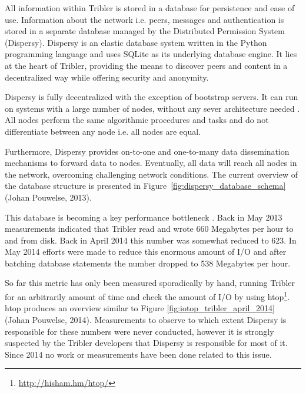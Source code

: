 All information within Tribler is stored in a database for persistence and ease of use.
Information about the network i.e. peers, messages and authentication is stored in a separate database managed by the Distributed Permission System (Dispersy).
Dispersy is an elastic database system written in the Python programming language and uses SQLite as its underlying database engine.
It lies at the heart of Tribler, providing the means to discover peers and content in a decentralized way while offering security and anonymity.

Dispersy is fully decentralized with the exception of bootstrap servers.
It can run on systems with a large number of nodes, without any sever architecture needed \cite{dispersy2016dispersy, zeilemaker2013dispersy}.
All nodes perform the same algorithmic procedures and tasks and do not differentiate between any node i.e. all nodes are equal.

Furthermore, Dispersy provides on-to-one and one-to-many data dissemination mechanisms to forward data to nodes.
Eventually, all data will reach all nodes in the network, overcoming challenging network conditions.
The current overview of the database structure is presented in Figure~\ref{fig:dispersy_database_schema} (Johan Pouwelse, 2013).

This database is becoming a key performance bottleneck \cite{pouwelse2014reduce}.
Back in May 2013 measurements indicated that Tribler read and wrote 660 Megabytes per hour to and from disk.
Back in April 2014 this number was somewhat reduced to 623.
In May 2014 efforts were made to reduce this enormous amount of I/O and after batching database statements the number dropped to 538 Megabytes per hour.

So far this metric has only been measured sporadically by hand, running Tribler for an arbitrarily amount of time and check the amount of I/O by using htop\footnote{\url{http://hisham.hm/htop/}}.
htop produces an overview similar to Figure \ref{fig:iotop_tribler_april_2014} (Johan Pouwelse, 2014).
Measurements to observe to which extent Dispersy is responsible for these numbers were never conducted, however it is strongly suspected by the Tribler developers that Dispersy is responsible for most of it.
Since 2014 no work or measurements have been done related to this issue.

